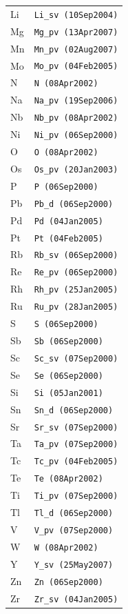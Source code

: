 \begin{longtable}{@{}l l@{}}
Li & \texttt{Li\_sv (10Sep2004)} \\
Mg & \texttt{Mg\_pv (13Apr2007)} \\
Mn & \texttt{Mn\_pv (02Aug2007)} \\
Mo & \texttt{Mo\_pv (04Feb2005)} \\
N & \texttt{N (08Apr2002)} \\
Na & \texttt{Na\_pv (19Sep2006)} \\
Nb & \texttt{Nb\_pv (08Apr2002)} \\
Ni & \texttt{Ni\_pv (06Sep2000)} \\
O & \texttt{O (08Apr2002)} \\
Os & \texttt{Os\_pv (20Jan2003)} \\
P & \texttt{P (06Sep2000)} \\
Pb & \texttt{Pb\_d (06Sep2000)} \\
Pd & \texttt{Pd (04Jan2005)} \\
Pt & \texttt{Pt (04Feb2005)} \\
Rb & \texttt{Rb\_sv (06Sep2000)} \\
Re & \texttt{Re\_pv (06Sep2000)} \\
Rh & \texttt{Rh\_pv (25Jan2005)} \\
Ru & \texttt{Ru\_pv (28Jan2005)} \\
S & \texttt{S (06Sep2000)} \\
Sb & \texttt{Sb (06Sep2000)} \\
Sc & \texttt{Sc\_sv (07Sep2000)} \\
Se & \texttt{Se (06Sep2000)} \\
Si & \texttt{Si (05Jan2001)} \\
Sn & \texttt{Sn\_d (06Sep2000)} \\
Sr & \texttt{Sr\_sv (07Sep2000)} \\
Ta & \texttt{Ta\_pv (07Sep2000)} \\
Tc & \texttt{Tc\_pv (04Feb2005)} \\
Te & \texttt{Te (08Apr2002)} \\
Ti & \texttt{Ti\_pv (07Sep2000)} \\
Tl & \texttt{Tl\_d (06Sep2000)} \\
V & \texttt{V\_pv (07Sep2000)} \\
W & \texttt{W (08Apr2002)} \\
Y & \texttt{Y\_sv (25May2007)} \\
Zn & \texttt{Zn (06Sep2000)} \\
Zr & \texttt{Zr\_sv (04Jan2005)} \\
\end{longtable}